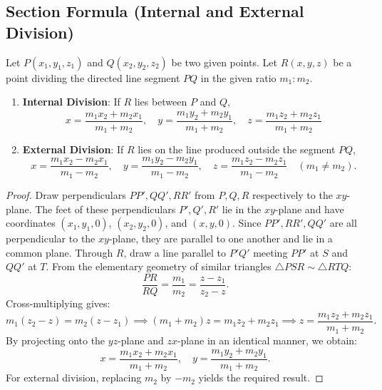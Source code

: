 \subsection{Section Formula (Internal and External Division)}
\begin{theorembox}
Let $P(x_1, y_1, z_1)$ and $Q(x_2, y_2, z_2)$ be two given points. Let $R(x, y, z)$ be a point dividing the directed line segment $PQ$ in the given ratio $m_1 : m_2$.
\begin{enumerate}
    \item \textbf{Internal Division}: If $R$ lies between $P$ and $Q$,
    \begin{equation}
        \boxed{x = \frac{m_1 x_2 + m_2 x_1}{m_1 + m_2}, \quad y = \frac{m_1 y_2 + m_2 y_1}{m_1 + m_2}, \quad z = \frac{m_1 z_2 + m_2 z_1}{m_1 + m_2}}
    \end{equation}
    \item \textbf{External Division}: If $R$ lies on the line produced outside the segment $PQ$,
    \begin{equation}
        \boxed{x = \frac{m_1 x_2 - m_2 x_1}{m_1 - m_2}, \quad y = \frac{m_1 y_2 - m_2 y_1}{m_1 - m_2}, \quad z = \frac{m_1 z_2 - m_2 z_1}{m_1 - m_2}} \quad (m_1 \neq m_2).
    \end{equation}
\end{enumerate}
\end{theorembox}

\begin{proof}
Draw perpendiculars $PP', QQ', RR'$ from $P, Q, R$ respectively to the $xy$-plane. The feet of these perpendiculars $P', Q', R'$ lie in the $xy$-plane and have coordinates $(x_1, y_1, 0)$, $(x_2, y_2, 0)$, and $(x, y, 0)$.
Since $PP', RR', QQ'$ are all perpendicular to the $xy$-plane, they are parallel to one another and lie in a common plane.
Through $R$, draw a line parallel to $P'Q'$ meeting $PP'$ at $S$ and $QQ'$ at $T$.
From the elementary geometry of similar triangles $\triangle PSR \sim \triangle RTQ$:
\begin{equation}
    \frac{PR}{RQ} = \frac{m_1}{m_2} = \frac{z - z_1}{z_2 - z}.
\end{equation}
Cross-multiplying gives:
\begin{equation}
    m_1(z_2 - z) = m_2(z - z_1) \implies (m_1 + m_2)z = m_1 z_2 + m_2 z_1 \implies z = \frac{m_1 z_2 + m_2 z_1}{m_1 + m_2}.
\end{equation}
By projecting onto the $yz$-plane and $zx$-plane in an identical manner, we obtain:
\begin{equation}
    x = \frac{m_1 x_2 + m_2 x_1}{m_1 + m_2}, \quad y = \frac{m_1 y_2 + m_2 y_1}{m_1 + m_2}.
\end{equation}
For external division, replacing $m_2$ by $-m_2$ yields the required result.
\end{proof}

